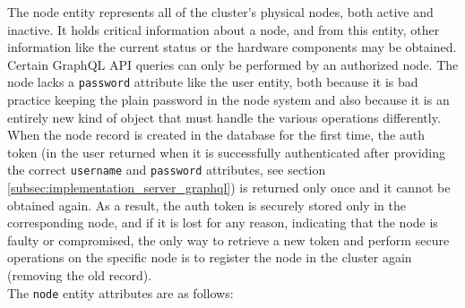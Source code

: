 The node entity represents all of the cluster's physical nodes, both active and inactive.
It holds critical information about a node, and from this entity, other
information like the current status or the hardware components may be obtained. \\ %
Certain GraphQL API queries can only be performed by an authorized node. The node
lacks a \texttt{password} attribute like the user entity, both because it is bad
practice keeping the plain password in the node system and also because it is an
entirely new kind of object that must handle the various operations differently.
When the node record is created in the database for the first time, the auth token
(in the user returned when it is successfully authenticated after providing the
correct \texttt{username} and \texttt{password} attributes, see section \ref{subsec:implementation_server_graphql})
is returned only once and it cannot be obtained again. As a result, the auth
token is securely stored only in the corresponding node, and if it is lost for any
reason, indicating that the node is faulty or compromised, the only way to retrieve
a new token and perform secure operations on the specific node is to register the
node in the cluster again (removing the old record). \\ %
The \texttt{node} entity attributes are as follows:

